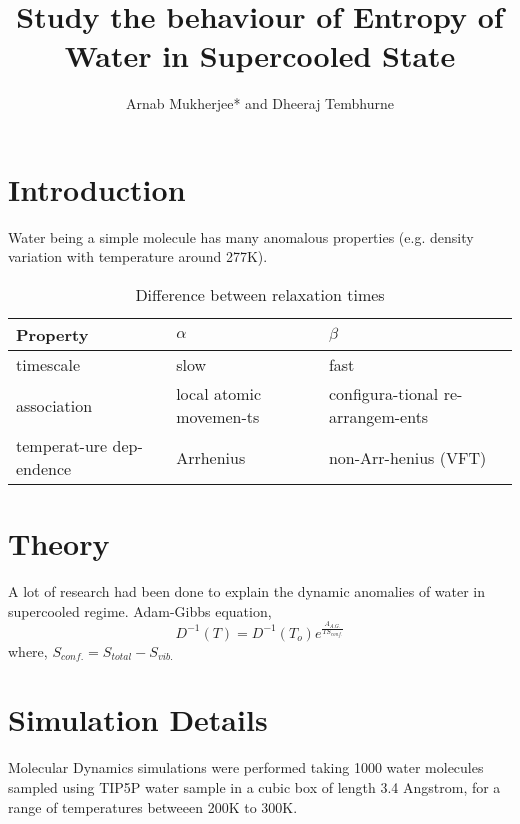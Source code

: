 \documentclass{article}[a4paper,12pt,twoside]
\title{Study the behaviour of Entropy of Water in Supercooled State}
\author{Arnab Mukherjee* and Dheeraj Tembhurne}
\begin{document}
\pagecolor{mycoloryellow}               %
\section{Introduction}
Water being a simple molecule has many anomalous properties (e.g. density variation with temperature around 277K).
\begin{table}[!hbt]
	\centering
	\caption{Difference between relaxation times}
	\vspace{1.5mm}
	\begin{tabular}{|p{1.5cm}|p{1.5cm}|p{1.5cm}|}
		\hline \textbf{Property}           &   $\alpha$  	    &    $\beta$   \\
		\hline timescale      	           &    slow	    	    &      fast    \\
		\hline association                 &local atomic movemen-ts & configura-tional re-arrangem-ents \\
		\hline temperat-ure dep-endence    & Arrhenius              &  non-Arr-henius (VFT) \\
		\hline
	\end{tabular} 
\end{table}

\section{Theory}
A lot of research had been done to explain the dynamic anomalies of water in supercooled regime. Adam-Gibbs equation, 
\begin{equation}
	D^{-1}(T)=D^{-1}(T_o) e^{\frac{A_{A.G.}}{TS_{conf.}}} 
\end{equation}
where, $S_{conf.}=S_{total}-S_{vib.}$

\section{Simulation Details}
Molecular Dynamics simulations were performed taking 1000 water molecules sampled using TIP5P water sample in a cubic box of length 3.4 Angstrom, for a range of temperatures betweeen 200K to 300K. 
\end{document}
